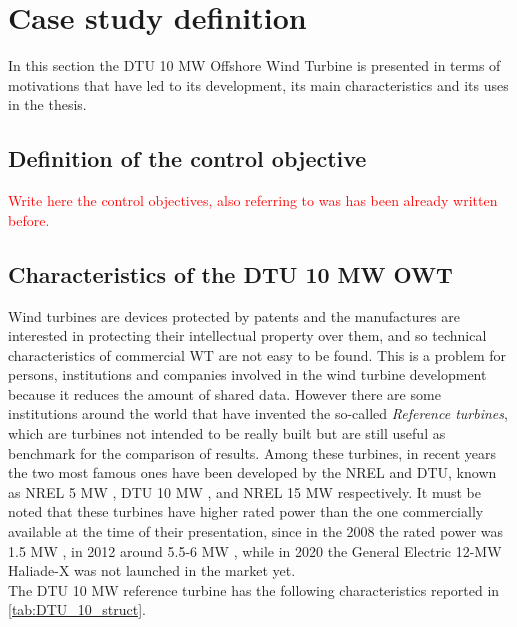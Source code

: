 \newpage
\section{Case study definition}\label{sec:c_10MW_OWT}
In this section the DTU 10 MW Offshore Wind Turbine is presented in terms of motivations that have led to its development, its main characteristics and its uses in the thesis. 

\subsection{Definition of the control objective}
\textcolor{red}{Write here the control objectives, also referring to was has been already written before.}
\subsection{Characteristics of the DTU 10 MW OWT}
Wind turbines are devices protected by patents and the manufactures are interested in protecting their intellectual property over them, and so technical characteristics of commercial \acrshort{WT} are not easy to be found. This is a problem for persons, institutions and companies involved in the wind turbine development because it reduces the amount of shared data. However there are some institutions around the world that have invented the so-called \textit{Reference turbines}, which are turbines not intended to be really built but are still useful as benchmark for the comparison of results. Among these turbines, in recent years the two most famous ones have been developed by the \acrfull{NREL} and \acrfull{DTU}, known as NREL 5 MW \cite{NREL_5MW_reference}, DTU 10 MW \cite{DTU_Wind_Energy_Report-I-0092}, and NREL 15 MW \cite{NREL_15MW} respectively. It must be noted that these  turbines have higher rated power than the one commercially available at the time of their presentation, since in the 2008 the rated power was 1.5 MW \cite{Wind_Energy_Technology_Current_Status_and_RD_Futur}, in 2012 around 5.5-6 MW \cite{European_offshore_statistics_2012}, while in 2020 the General Electric 12-MW Haliade-X was not launched in the market yet. \\
The DTU 10 MW reference turbine has the following characteristics reported in \autoref{tab:DTU_10_struct}.
